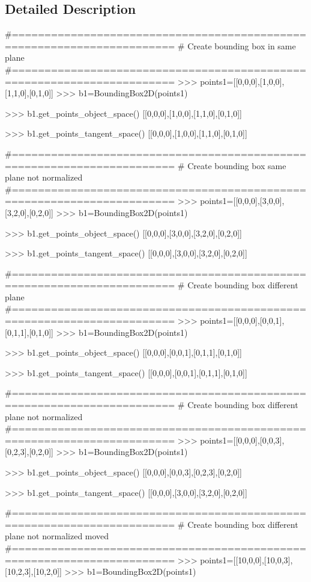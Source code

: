 \subsection{Detailed Description}
\begin{DoxyVerb}#=======================================================================
# Create bounding box in same plane
#=======================================================================
>>> points1=[[0,0,0],[1,0,0],[1,1,0],[0,1,0]]
>>> b1=BoundingBox2D(points1)

>>> b1.get_points_object_space()
[[0,0,0],[1,0,0],[1,1,0],[0,1,0]]

>>> b1.get_points_tangent_space()
[[0,0,0],[1,0,0],[1,1,0],[0,1,0]]

#=======================================================================
# Create bounding box same plane not normalized
#=======================================================================
>>> points1=[[0,0,0],[3,0,0],[3,2,0],[0,2,0]]
>>> b1=BoundingBox2D(points1)

>>> b1.get_points_object_space()
[[0,0,0],[3,0,0],[3,2,0],[0,2,0]]

>>> b1.get_points_tangent_space()
[[0,0,0],[3,0,0],[3,2,0],[0,2,0]]

#=======================================================================
# Create bounding box different plane
#=======================================================================
>>> points1=[[0,0,0],[0,0,1],[0,1,1],[0,1,0]]
>>> b1=BoundingBox2D(points1)

>>> b1.get_points_object_space()
[[0,0,0],[0,0,1],[0,1,1],[0,1,0]]

>>> b1.get_points_tangent_space()
[[0,0,0],[0,0,1],[0,1,1],[0,1,0]]

#=======================================================================
# Create bounding box different plane not normalized
#=======================================================================
>>> points1=[[0,0,0],[0,0,3],[0,2,3],[0,2,0]]
>>> b1=BoundingBox2D(points1)

>>> b1.get_points_object_space()
[[0,0,0],[0,0,3],[0,2,3],[0,2,0]]

>>> b1.get_points_tangent_space()
[[0,0,0],[3,0,0],[3,2,0],[0,2,0]]

#=======================================================================
# Create bounding box different plane not normalized moved
#=======================================================================
>>> points1=[[10,0,0],[10,0,3],[10,2,3],[10,2,0]]
>>> b1=BoundingBox2D(points1)


\end{DoxyVerb}
